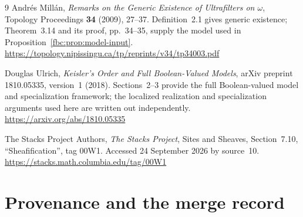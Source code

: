 \documentclass[11pt,letterpaper]{article}
\theoremstyle{definition}
\theoremstyle{remark}
\begin{document}
\begin{thebibliography}{9}
Andr\'es Mill\'an, \emph{Remarks on the Generic Existence of
Ultrafilters on $\omega$}, Topology Proceedings \textbf{34}
(2009), 27--37. Definition~2.1 gives generic existence;
Theorem~3.14 and its proof, pp.~34--35, supply the model used in
Proposition~\ref{fbc:prop:model-input}.
\newblock\url{https://topology.nipissingu.ca/tp/reprints/v34/tp34003.pdf}

Douglas Ulrich, \emph{Keisler's Order and Full Boolean-Valued Models},
arXiv preprint 1810.05335, version~1 (2018). Sections~2--3 provide the full Boolean-valued
model and specialization framework; the localized realization and
specialization arguments used here are written out independently.
\newblock\url{https://arxiv.org/abs/1810.05335}

The Stacks Project Authors, \emph{The Stacks Project}, Sites and
Sheaves, Section~7.10, ``Sheafification'', tag 00W1. Accessed
24 September 2026 by source~10.
\newblock\url{https://stacks.math.columbia.edu/tag/00W1}

\end{thebibliography}

\appendix
\section{Provenance and the merge record}
\label{fbc:app:provenance}
\end{document}
